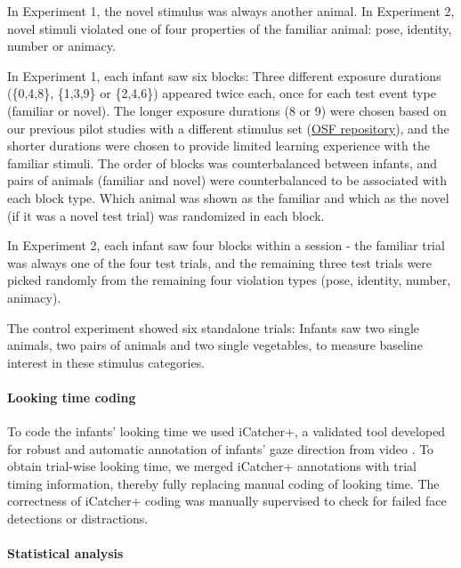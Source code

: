 \documentclass[
]{article}
\begin{document}
In Experiment 1, the novel stimulus was always another animal. In Experiment 2, novel stimuli violated one of four properties of the familiar animal: pose, identity, number or animacy.

In Experiment 1, each infant saw six blocks: Three different exposure durations (\{0,4,8\}, \{1,3,9\} or \{2,4,6\}) appeared twice each, once for each test event type (familiar or novel). The longer exposure durations (8 or 9) were chosen based on our previous pilot studies with a different stimulus set (\href{https://osf.io/b3xsk/?view_only=5beeb6ed27874ae3bfe586ee2b38381a}{OSF repository}), and the shorter durations were chosen to provide limited learning experience with the familiar stimuli. The order of blocks was counterbalanced between infants, and pairs of animals (familiar and novel) were counterbalanced to be associated with each block type. Which animal was shown as the familiar and which as the novel (if it was a novel test trial) was randomized in each block.

In Experiment 2, each infant saw four blocks within a session - the familiar trial was always one of the four test trials, and the remaining three test trials were picked randomly from the remaining four violation types (pose, identity, number, animacy). 

The control experiment showed six standalone trials: Infants saw two single animals, two pairs of animals and two single vegetables, to measure baseline interest in these stimulus categories.

\hypertarget{looking-time-coding}{%
\paragraph{Looking time coding}\label{looking-time-coding}}

To code the infants' looking time we used iCatcher+, a validated tool developed for robust and automatic annotation of infants' gaze direction from video \autocite{erel2023icatcher}. To obtain trial-wise looking time, we merged iCatcher+ annotations with trial timing information, thereby fully replacing manual coding of looking time. The correctness of iCatcher+ coding was manually supervised to check for failed face detections or distractions.

\hypertarget{statistical-analysis}{%
\paragraph{Statistical analysis}\label{statistical-analysis}}
\end{document}
